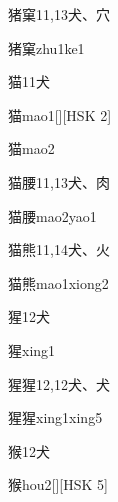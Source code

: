 \begin{Entry}{猪窠}{11,13}{⽝、⽳}
  \begin{Phonetics}{猪窠}{zhu1ke1}
  \end{Phonetics}
\end{Entry}

\begin{Entry}{猫}{11}{⽝}
  \begin{Phonetics}{猫}{mao1}[][HSK 2]
  \end{Phonetics}
  \begin{Phonetics}{猫}{mao2}
  \end{Phonetics}
\end{Entry}

\begin{Entry}{猫腰}{11,13}{⽝、⾁}
  \begin{Phonetics}{猫腰}{mao2yao1}
  \end{Phonetics}
\end{Entry}

\begin{Entry}{猫熊}{11,14}{⽝、⽕}
  \begin{Phonetics}{猫熊}{mao1xiong2}
  \end{Phonetics}
\end{Entry}

\begin{Entry}{猩}{12}{⽝}
  \begin{Phonetics}{猩}{xing1}
  \end{Phonetics}
\end{Entry}

\begin{Entry}{猩猩}{12,12}{⽝、⽝}
  \begin{Phonetics}{猩猩}{xing1xing5}
  \end{Phonetics}
\end{Entry}

\begin{Entry}{猴}{12}{⽝}
  \begin{Phonetics}{猴}{hou2}[][HSK 5]
  \end{Phonetics}
\end{Entry}

